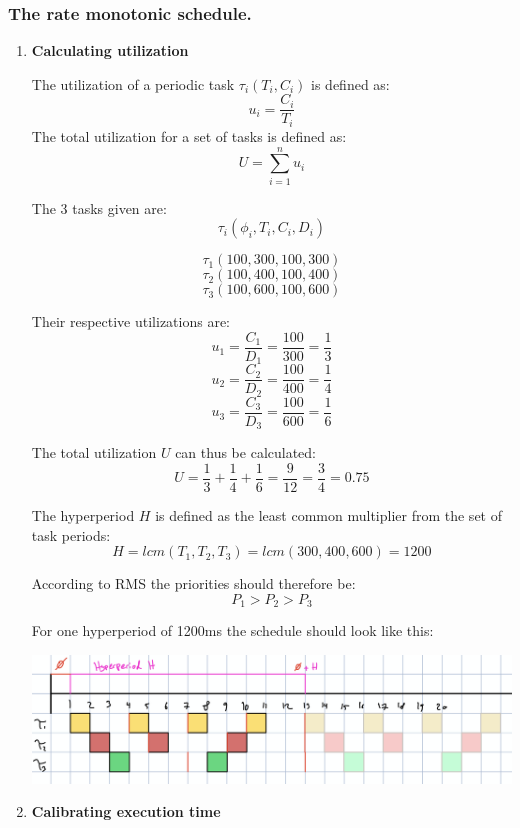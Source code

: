 \setcounter{section}{3}
\setcounter{subsection}{3}
\setcounter{subsubsection}{1}
\subsubsection{The rate monotonic schedule.}

\begin{enumerate}[label=\textbf{\arabic*})]
\item \textbf{Calculating utilization}

The utilization of a periodic task $\tau_i(T_i,C_i)$ is defined as:
\[u_i = \frac{C_i}{T_i}\]
The total utilization for a set of tasks is defined as:
\[U = \sum_{i=1}^{n} u_i\]

The 3 tasks given are:
\[\tau_i(\phi_i, T_i, C_i, D_i)\]

\[\tau_1(100, 300, 100, 300)\]
\[\tau_2(100, 400, 100, 400)\]
\[\tau_3(100, 600, 100, 600)\]

Their respective utilizations are:
\[u_1 = \frac{C_1}{D_1} = \frac{100}{300} = \frac{1}{3}\]
\[u_2 = \frac{C_2}{D_2} = \frac{100}{400} = \frac{1}{4}\]
\[u_3 = \frac{C_3}{D_3} = \frac{100}{600} = \frac{1}{6}\]

The total utilization $U$ can thus be calculated:
\[U = \frac{1}{3} + \frac{1}{4} + \frac{1}{6} = \frac{9}{12} = \frac{3}{4} = 0.75\]

The hyperperiod $H$ is defined as the least common multiplier from the set of task periods:
\[H = lcm(T_1, T_2, T_3) = lcm (300, 400, 600) = 1200\]

According to RMS the priorities should therefore be:
\[P_1 > P_2 > P_3\]

For one hyperperiod of 1200ms the schedule should look like this:

\includegraphics[width=0.9\linewidth]{1-rate-monotonic-schedule}

\item \textbf{Calibrating execution time}


\end{enumerate}
